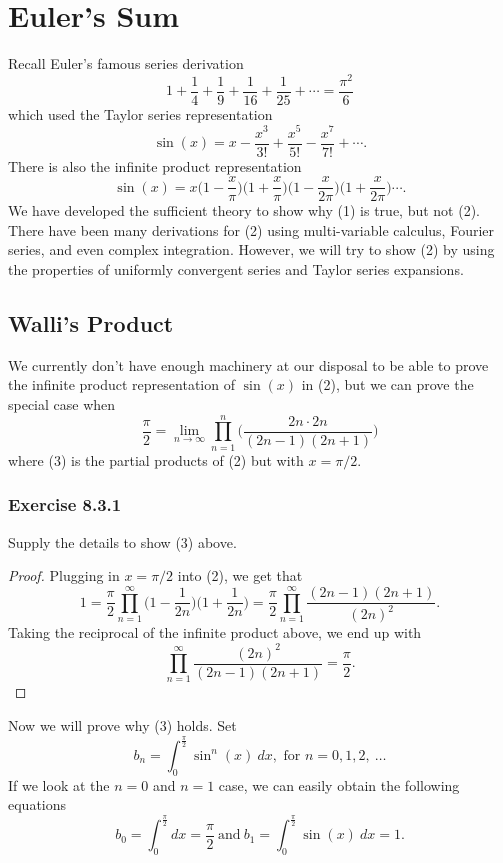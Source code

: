 \section{Euler's Sum}

Recall Euler's famous series derivation
\[  1 + \frac{ 1 }{ 4 }  + \frac{ 1 }{ 9  }  + \frac{ 1 }{ 16 } + \frac{ 1 }{ 25 } + \dotsb = \frac{ \pi^{2} }{ 6 } \] which used the Taylor series representation 
\[  \sin(x) = x - \frac{ x^{3} }{ 3! } + \frac{ x^{5} }{ 5! } - \frac{ x^{7} }{ 7! } + \dotsb. \tag{1} \] There is also the infinite product representation 
\[  \sin(x) = x \Big( 1 - \frac{ x }{ \pi }  \Big) \Big( 1 + \frac{ x }{ \pi }  \Big) \Big(  1 - \frac{ x }{ 2 \pi }  \Big) \Big( 1 + \frac{ x  }{ 2 \pi }  \Big) \dotsb. \tag{2} \] We have developed the sufficient theory to show why (1) is true, but not (2). There have been many derivations for (2) using multi-variable calculus, Fourier series, and even complex integration. However, we will try to show (2) by using the properties of uniformly convergent series and Taylor series expansions.

\subsection{Walli's Product}

We currently don't have enough machinery at our disposal to be able to prove the infinite product representation of \( \sin(x)  \) in (2), but we can prove the special case when 
\[  \frac{ \pi }{ 2 }  = \lim_{ n \to \infty  }  \prod_{n=1}^{n} \Big(  \frac{ 2n \cdot 2n  }{ (2n-1)(2n+1) }  \Big) \tag{3} \] where (3) is the partial products of (2) but with \( x = \pi / 2  \).

\subsubsection{Exercise 8.3.1} Supply the details to show (3) above.
\begin{proof}
Plugging in \( x = \pi / 2  \) into (2), we get that 
\[  1 = \frac{ \pi }{ 2 }  \prod_{n=1}^{\infty } \Big( 1 - \frac{ 1 }{ 2n }  \Big)\Big( 1 + \frac{ 1 }{ 2n }  \Big) =  \frac{ \pi }{ 2 }  \prod_{n=1}^{\infty } \frac{ (2n-1)(2n+1) }{ (2n)^{2} }.  \]
Taking the reciprocal of the infinite product above, we end up with
\[  \prod_{n=1}^{\infty } \frac{ (2n)^{2} }{  (2n-1) (2n+1) } = \frac{ \pi }{ 2 }.  \]
\end{proof}

Now we will prove why (3) holds. Set 
\[  b_{n} = \int_{ 0 }^{ \frac{ \pi }{ 2 }  } \sin^{n}(x)  \ dx , \text{ for } n = 0,1,2, \ \dots \] If we look at the \( n=0  \) and \( n = 1  \) case, we can easily obtain the following equations 
\[  b_{0 } = \int_{ 0 }^{ \frac{ \pi }{ 2 }  }  dx = \frac{ \pi }{ 2 } \ \text{and} \ b_{1} = \int_{ 0 }^{ \frac{ \pi }{ 2 }  } \sin(x)  \ dx = 1. \]
